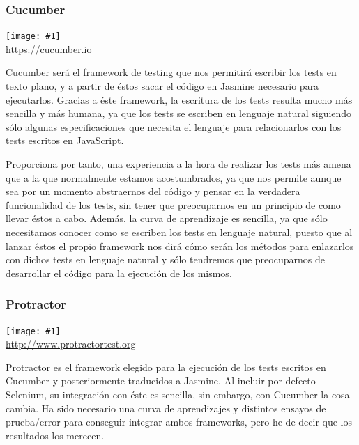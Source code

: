 \documentclass[11pt,openany]{book}
\newcommand{\logo}[2]{\medskip\begin{center}\texttt{[image: \#1]}\\\scriptsize\url{#2}\end{center}\bigskip}
\begin{document}
\subsubsection{Cucumber}

\logo{logos/cucumber.png}{https://cucumber.io}

Cucumber será el framework de testing que nos permitirá escribir los tests en texto plano, y a partir de éstos sacar el código en Jasmine necesario para ejecutarlos. Gracias a éste framework, la escritura de los tests resulta mucho más sencilla y más humana, ya que los tests se escriben en lenguaje natural siguiendo sólo algunas especificaciones que necesita el lenguaje para relacionarlos con los tests escritos en JavaScript. 

Proporciona por tanto, una experiencia a la hora de realizar los tests más amena que a la que normalmente estamos acostumbrados, ya que nos permite aunque sea por un momento abstraernos del código y pensar en la verdadera funcionalidad de los tests, sin tener que preocuparnos en un principio de como llevar éstos a cabo. Además, la curva de aprendizaje es sencilla, ya que sólo necesitamos conocer como se escriben los tests en lenguaje natural, puesto que al lanzar éstos el propio framework nos dirá cómo serán los métodos para enlazarlos con dichos tests en lenguaje natural y sólo tendremos que preocuparnos de desarrollar el código para la ejecución de los mismos.

\subsubsection{Protractor}

\logo{logos/protractor.png}{http://www.protractortest.org}

Protractor es el framework elegido para la ejecución de los tests escritos en Cucumber y posteriormente traducidos a Jasmine. Al incluir por defecto Selenium, su integración con éste es sencilla, sin embargo, con Cucumber la cosa cambia. Ha sido necesario una curva de aprendizajes y distintos ensayos de prueba/error para conseguir integrar ambos frameworks, pero he de decir que los resultados los merecen.
\end{document}
